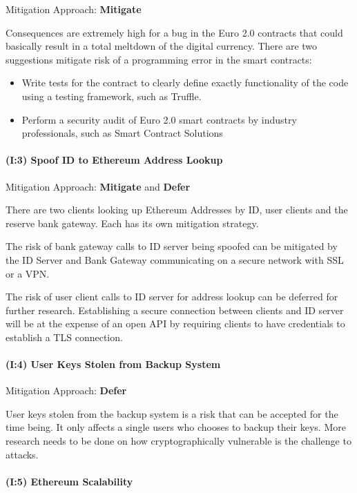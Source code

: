 \documentclass[a4paper,12pt]{article} %
\begin{document}
{Mitigation Approach: \textbf{Mitigate}

Consequences are extremely high for a bug in the Euro 2.0 contracts that could basically result in a total meltdown of the digital currency. There are two suggestions mitigate risk of a programming error in the smart contracts:
\begin{itemize}
	\item Write tests for the contract to clearly define exactly functionality of the code using a testing framework, such as Truffle\cite{ethereumTruffle}.
	\item Perform a security audit of Euro 2.0 smart contracts by industry professionals, such as Smart Contract Solutions\cite{smartContractSolutions}
\end{itemize}

\paragraph{(I:3) Spoof ID to Ethereum Address Lookup}

Mitigation Approach: \textbf{Mitigate} and \textbf{Defer}

There are two clients looking up Ethereum Addresses by ID, user clients and the reserve bank gateway. Each has its own mitigation strategy.

The risk of bank gateway calls to ID server being spoofed can be mitigated by the ID Server and Bank Gateway communicating on a secure network with SSL or a VPN.

The risk of user client calls to ID server for address lookup can be deferred for further research. Establishing a secure connection between clients and ID server will be at the expense of an open API by requiring clients to have credentials to establish a TLS connection.

\paragraph{(I:4) User Keys Stolen from Backup System}

Mitigation Approach: \textbf{Defer}

User keys stolen from the backup system is a risk that can be accepted for the time being. It only affects a single users who chooses to backup their keys. More research needs to be done on how cryptographically vulnerable is the challenge to attacks.

\paragraph{(I:5) Ethereum Scalability}

}
\end{document}
